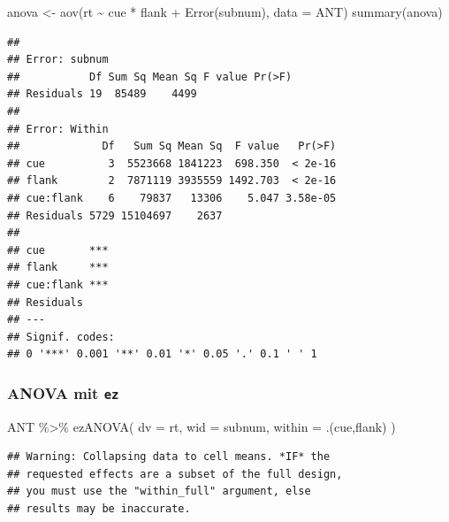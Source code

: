 \documentclass[
]{book}
\newenvironment{Shaded}{\begin{snugshade}}{\end{snugshade}}
\newcommand{\AttributeTok}[1]{\textcolor[rgb]{0.77,0.63,0.00}{#1}}
\newcommand{\FunctionTok}[1]{\textcolor[rgb]{0.00,0.00,0.00}{#1}}
\newcommand{\NormalTok}[1]{#1}
\newcommand{\OtherTok}[1]{\textcolor[rgb]{0.56,0.35,0.01}{#1}}
\newcommand{\SpecialCharTok}[1]{\textcolor[rgb]{0.00,0.00,0.00}{#1}}
\begin{document}
\begin{Shaded}
\begin{Highlighting}[]
\NormalTok{anova }\OtherTok{\textless{}{-}} \FunctionTok{aov}\NormalTok{(rt }\SpecialCharTok{\textasciitilde{}}\NormalTok{ cue }\SpecialCharTok{*}\NormalTok{ flank }\SpecialCharTok{+} \FunctionTok{Error}\NormalTok{(subnum), }\AttributeTok{data =}\NormalTok{ ANT)}
\FunctionTok{summary}\NormalTok{(anova)}
\end{Highlighting}
\end{Shaded}

\begin{verbatim}
## 
## Error: subnum
##           Df Sum Sq Mean Sq F value Pr(>F)
## Residuals 19  85489    4499               
## 
## Error: Within
##             Df   Sum Sq Mean Sq  F value   Pr(>F)
## cue          3  5523668 1841223  698.350  < 2e-16
## flank        2  7871119 3935559 1492.703  < 2e-16
## cue:flank    6    79837   13306    5.047 3.58e-05
## Residuals 5729 15104697    2637                  
##              
## cue       ***
## flank     ***
## cue:flank ***
## Residuals    
## ---
## Signif. codes:  
## 0 '***' 0.001 '**' 0.01 '*' 0.05 '.' 0.1 ' ' 1
\end{verbatim}

\hypertarget{anova-mit-ez}{%
\subsubsection{\texorpdfstring{ANOVA mit \texttt{ez}}{ANOVA mit ez}}\label{anova-mit-ez}}

\begin{Shaded}
\begin{Highlighting}[]
\NormalTok{ANT }\SpecialCharTok{\%\textgreater{}\%} 
  \FunctionTok{ezANOVA}\NormalTok{(}
    \AttributeTok{dv =}\NormalTok{ rt,}
    \AttributeTok{wid =}\NormalTok{ subnum,}
    \AttributeTok{within =}\NormalTok{ .(cue,flank)}
\NormalTok{  )}
\end{Highlighting}
\end{Shaded}

\begin{verbatim}
## Warning: Collapsing data to cell means. *IF* the
## requested effects are a subset of the full design,
## you must use the "within_full" argument, else
## results may be inaccurate.
\end{verbatim}
\end{document}
